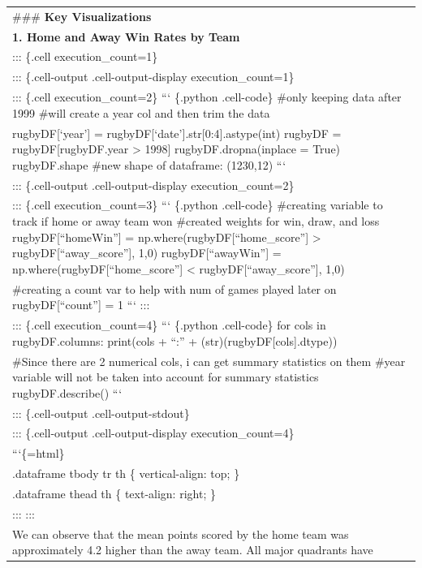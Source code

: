 \documentclass[
  letterpaper,
  DIV=11,
  numbers=noendperiod]{scrartcl}
\begin{document}
\begin{longtable}[]{@{}
  >{\raggedright\arraybackslash}p{}@{}}
\toprule\noalign{}
\endhead
\bottomrule\noalign{}
\endlastfoot
\#\#\# \textbf{Key Visualizations} \\
\textbf{1. Home and Away Win Rates by Team}  \\
::: \{.cell execution\_count=1\} \\
::: \{.cell-output .cell-output-display execution\_count=1\} \\
::: \{.cell execution\_count=2\} ``` \{.python .cell-code\} \#only
keeping data after 1999 \#will create a year col and then trim the
data \\
rugbyDF{[}`year'{]} = rugbyDF{[}`date'{]}.str{[}0:4{]}.astype(int)
rugbyDF = rugbyDF{[}rugbyDF.year \textgreater{} 1998{]}
rugbyDF.dropna(inplace = True) rugbyDF.shape \#new shape of dataframe:
(1230,12) ``` \\
::: \{.cell-output .cell-output-display execution\_count=2\} \\
::: \{.cell execution\_count=3\} ``` \{.python .cell-code\} \#creating
variable to track if home or away team won \#created weights for win,
draw, and loss rugbyDF{[}``homeWin''{]} =
np.where(rugbyDF{[}``home\_score''{]} \textgreater{}
rugbyDF{[}``away\_score''{]}, 1,0) rugbyDF{[}``awayWin''{]} =
np.where(rugbyDF{[}``home\_score''{]} \textless{}
rugbyDF{[}``away\_score''{]}, 1,0) \\
\#creating a count var to help with num of games played later on
rugbyDF{[}``count''{]} = 1 ``` ::: \\
::: \{.cell execution\_count=4\} ``` \{.python .cell-code\} for cols in
rugbyDF.columns: print(cols + ``:'' + (str)(rugbyDF{[}cols{]}.dtype)) \\
\#Since there are 2 numerical cols, i can get summary statistics on them
\#year variable will not be taken into account for summary statistics
rugbyDF.describe() ``` \\
::: \{.cell-output .cell-output-stdout\} \\
::: \{.cell-output .cell-output-display execution\_count=4\} \\
```\{=html\} \\
.dataframe tbody tr th \{ vertical-align: top; \} \\
.dataframe thead th \{ text-align: right; \} \\
::: ::: \\
We can observe that the mean points scored by the home team was
approximately 4.2 higher than the away team. All major quadrants have

\end{longtable}
\end{document}
